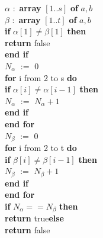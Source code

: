 \documentclass[a4paper,14pt]{article}
\newcommand\tab[1][0.5cm]{\hspace*{#1}}
\numberwithin{equation}{section}
\begin{document}
\noindent
 $\alpha$  $:$ \textbf{array}  $[1..s]$  \textbf{of}  ${a, b}$ \\
 $\beta$  $:$ \textbf{array}  $[1..t]$  \textbf{of}  ${a, b}$ \\
\textbf{if}  $\alpha[1] \neq \beta[1]$ \textbf{then} \\
\tab \textbf{return} false\\
\textbf{end if}\\
 $N_{\alpha}$  $:=$ 0\\
\textbf{for} i from 2 to s \textbf{do} \\
\tab \textbf{if}  $\alpha[i] \neq \alpha[i-1]$ \textbf{then} \\
 $N_{\alpha}$  $:=$  $N_{\alpha} + 1$ \\
\tab \textbf{end if}\\
\textbf{end for}\\
 $N_{\beta}$  $:=$ 0\\
\textbf{for} i from 2 to t \textbf{do} \\
\tab \textbf{if}  $\beta[i] \neq \beta[i-1]$ \textbf{then} \\
 $N_{\beta}$  $:=$  $N_{\beta} + 1$ \\
\tab \textbf{end if}\\
\textbf{end for}\\
\textbf{if}  $N_{\alpha} == N_{\beta}$ \textbf{then} \\
\tab \textbf{return} true\textbf{else} \\
\tab \textbf{return} false
\end{document}
